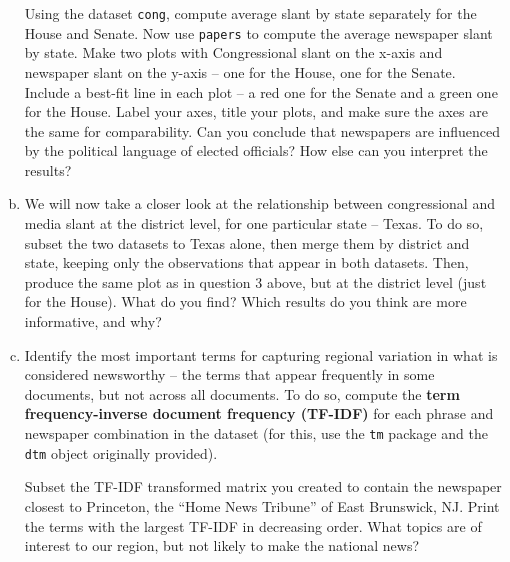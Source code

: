 \documentclass[11pt]{article}
\begin{document}
\begin{enumerate}[a.]
Using the dataset {\tt cong}, compute average slant by state separately for the House and Senate. Now use {\tt papers} to compute the average newspaper slant by state. Make two plots with Congressional slant on the x-axis and newspaper slant on the y-axis -- one for the House, one for the Senate. Include a best-fit line in each plot -- a red one for the Senate and a green one for the House. Label your axes, title your plots, and make sure the axes are the same for comparability. Can you conclude that newspapers are influenced by the political language of elected officials? How else can you interpret the results? 
\item We will now take a closer look at the relationship between congressional and media slant at the district level, for one particular state -- Texas. To do so, subset the two datasets to Texas alone, then merge them by district and state, keeping only the observations that appear in both datasets. Then, produce the same plot as in question 3 above, but at the district level (just for the House). What do you find?  Which results do you think are more informative, and why?
\item Identify the most important terms for capturing regional variation in what is considered newsworthy -- the terms that appear frequently in some documents, but not across all documents. To do so, compute the \textbf{term frequency-inverse document frequency (TF-IDF)} for each phrase and newspaper combination in the dataset (for this, use the {\tt tm} package and the {\tt dtm} object originally provided). 

Subset the TF-IDF transformed matrix you created to contain the newspaper closest to Princeton, the ``Home News Tribune'' of East Brunswick, NJ. Print the terms with the largest TF-IDF in decreasing order. What topics are of interest to our region, but not likely to make the national news? 
\end{enumerate}
\end{document}
